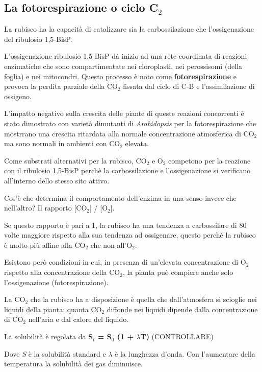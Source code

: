 \documentclass[]{article}
\begin{document}
\subsection{La fotorespirazione o ciclo
C$_2$}\label{la-fotorespirazione-o-ciclo-cux5f2}

La rubisco ha la capacità di catalizzare sia la carbossilazione che
l'ossigenazione del ribulosio 1,5-BisP.

L'ossigenazione ribulosio 1,5-BisP dà inizio ad una rete coordinata di
reazioni enzimatiche che sono compartimentate nei cloroplasti, nei
perossisomi (della foglia) e nei mitocondri. Questo processo è noto come
\textbf{fotorespirazione} e provoca la perdita parziale della CO$_2$
fissata dal ciclo di C-B e l'assimilazione di ossigeno.

L'impatto negativo sulla crescita delle piante di queste reazioni
concorrenti è stato dimostrato con varietà dimutanti di
\emph{Arabidopsis} per la fotorespirazione che mostrrano una crescita
ritardata alla normale concentrazione atmosferica di CO$_2$ ma sono
normali in ambienti con CO$_2$ elevata.

Come substrati alternativi per la rubisco, CO$_2$ e O$_2$ competono per
la reazione con il ribulosio 1,5-BisP perchè la carbossilazione e
l'ossigenazione si verificano all'interno dello stesso sito attivo.

Cos'è che determina il comportamento dell'enzima in una senso invece che
nell'altro? Il rapporto {[}CO$_2${]} / {[}O$_2${]}.

Se questo rapporto è pari a 1, la rubisco ha una tendenza a carbossilare
di 80 volte maggiore rispetto alla sua tendenza ad ossigenare, questo
perchè la rubisco è molto più affine alla CO$_2$ che non all'O$_2$.

Esistono però condizioni in cui, in presenza di un'elevata
concentrazione di O$_2$ rispetto alla concentrazione della CO$_2$, la
pianta può compiere anche solo l'ossigenazione (fotorespirazione).

La CO$_2$ che la rubisco ha a disposizione è quella che dall'atmosfera
si scioglie nei liquidi della pianta; quanta CO$_2$ diffonde nei liquidi
dipende dalla concentrazione di CO$_2$ nell'aria e dal calore del
liquido.

La solubilità è regolata da \textbf{S$_t$ = S$_0$ (1 + $\lambda$T)}
(CONTROLLARE)

Dove \emph{S} è la solubilità standard e \emph{$\lambda$} è la lunghezza
d'onda. Con l'aumentare della temperatura la solubilità dei gas
diminuisce.
\end{document}
